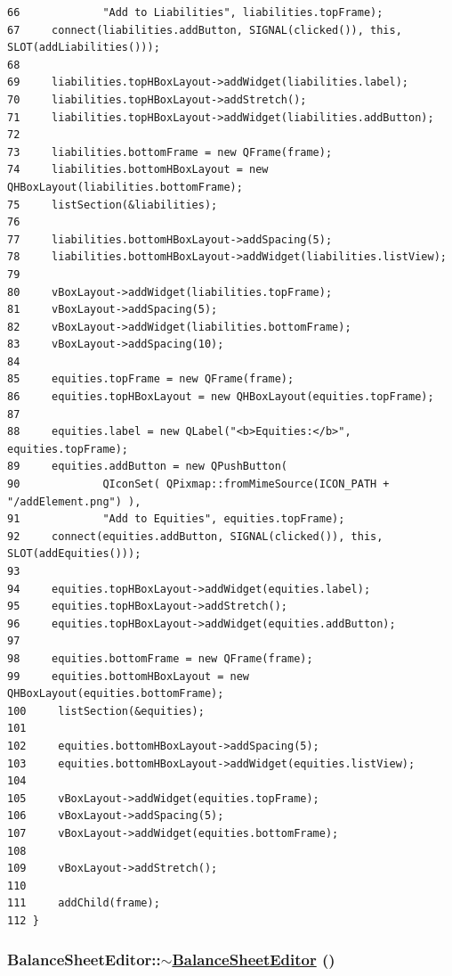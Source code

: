 \begin{verbatim}
66             "Add to Liabilities", liabilities.topFrame);
67     connect(liabilities.addButton, SIGNAL(clicked()), this, SLOT(addLiabilities()));
68     
69     liabilities.topHBoxLayout->addWidget(liabilities.label);
70     liabilities.topHBoxLayout->addStretch();
71     liabilities.topHBoxLayout->addWidget(liabilities.addButton);
72     
73     liabilities.bottomFrame = new QFrame(frame);
74     liabilities.bottomHBoxLayout = new QHBoxLayout(liabilities.bottomFrame);
75     listSection(&liabilities);
76     
77     liabilities.bottomHBoxLayout->addSpacing(5);
78     liabilities.bottomHBoxLayout->addWidget(liabilities.listView);
79     
80     vBoxLayout->addWidget(liabilities.topFrame);
81     vBoxLayout->addSpacing(5);
82     vBoxLayout->addWidget(liabilities.bottomFrame);
83     vBoxLayout->addSpacing(10);
84    
85     equities.topFrame = new QFrame(frame);
86     equities.topHBoxLayout = new QHBoxLayout(equities.topFrame);
87     
88     equities.label = new QLabel("<b>Equities:</b>", equities.topFrame);
89     equities.addButton = new QPushButton(
90             QIconSet( QPixmap::fromMimeSource(ICON_PATH + "/addElement.png") ),
91             "Add to Equities", equities.topFrame);
92     connect(equities.addButton, SIGNAL(clicked()), this, SLOT(addEquities()));
93     
94     equities.topHBoxLayout->addWidget(equities.label);
95     equities.topHBoxLayout->addStretch();
96     equities.topHBoxLayout->addWidget(equities.addButton);
97     
98     equities.bottomFrame = new QFrame(frame);
99     equities.bottomHBoxLayout = new QHBoxLayout(equities.bottomFrame);
100     listSection(&equities);
101     
102     equities.bottomHBoxLayout->addSpacing(5);
103     equities.bottomHBoxLayout->addWidget(equities.listView);
104     
105     vBoxLayout->addWidget(equities.topFrame);
106     vBoxLayout->addSpacing(5);
107     vBoxLayout->addWidget(equities.bottomFrame);
108     
109     vBoxLayout->addStretch();
110     
111     addChild(frame);
112 }
\end{verbatim}\normalsize 


\hypertarget{classBalanceSheetEditor_a1}{
\subsubsection[$\sim$BalanceSheetEditor]{\setlength{\rightskip}{0pt plus 5cm}Balance\-Sheet\-Editor::$\sim$\hyperlink{classBalanceSheetEditor}{Balance\-Sheet\-Editor} ()}}
\label{classBalanceSheetEditor_a1}



